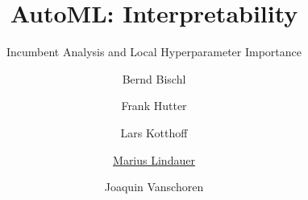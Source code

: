 


\title[AutoML: Local Importance]{AutoML: Interpretability}
\subtitle{Incumbent Analysis and Local Hyperparameter Importance}
\author[Marius Lindauer]{Bernd Bischl \and Frank Hutter \and Lars Kotthoff\newline \and \underline{Marius Lindauer} \and Joaquin Vanschoren}
\institute{}
\date{}




	
	\maketitle
	

